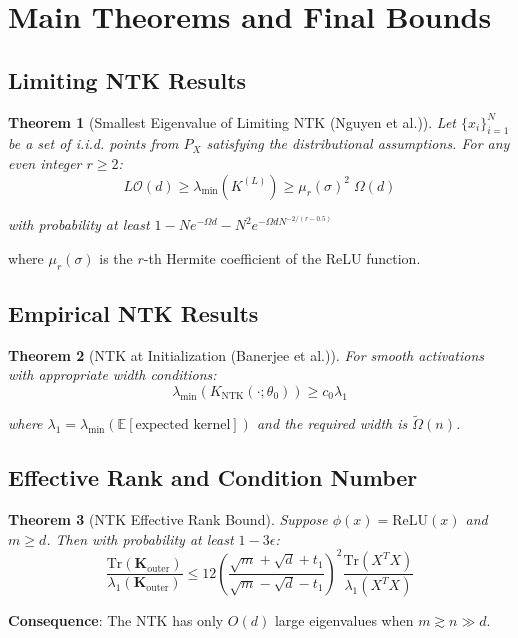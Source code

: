 \documentclass{article}
\newtheorem{theorem}{Theorem}[section]
\newcommand{\E}{\mathbb{E}}
\newcommand{\evmin}[1]{\lambda_{\min}\left(#1\right)}
\newcommand{\bigOmg}{\Omega}
\newcommand{\KNTK}{K_{\text{NTK}}}
\newcommand{\lambdaMin}{\lambda_{\min}}
\newcommand{\Order}{\mathcal{O}}
\newcommand{\TildeOmega}{\tilde{\Omega}}
\begin{document}
\section{Main Theorems and Final Bounds}

\subsection{Limiting NTK Results}

\begin{theorem}[Smallest Eigenvalue of Limiting NTK (Nguyen et al.)]
Let $\{x_i\}_{i=1}^{N}$ be a set of i.i.d. points from $P_X$ satisfying the distributional assumptions. For any even integer $r\ge 2$:
$$L\Order(d) \geq \evmin{K^{(L)}} \geq \mu_r(\sigma)^2\; \bigOmg(d)$$

with probability at least $1 - Ne^{-\bigOmg{d}} - N^2e^{-\bigOmg{dN^{-2/(r-0.5)}}}$
\end{theorem}

where $\mu_r(\sigma)$ is the $r$-th Hermite coefficient of the ReLU function.

\subsection{Empirical NTK Results}

\begin{theorem}[NTK at Initialization (Banerjee et al.)]
For smooth activations with appropriate width conditions:
$$\lambdaMin(\KNTK(\cdot;\theta_0)) \geq c_0 \lambda_1$$

where $\lambda_1 = \lambdaMin(\E[\text{expected kernel}])$ and the required width is $\TildeOmega(n)$.
\end{theorem}

\subsection{Effective Rank and Condition Number}

\begin{theorem}[NTK Effective Rank Bound]
Suppose $\phi(x) = \text{ReLU}(x)$ and $m \geq d$. Then with probability at least $1 - 3\epsilon$:
$$\frac{\text{Tr}(\mathbf{K}_{\text{outer}})}{\lambda_1(\mathbf{K}_{\text{outer}})} \leq 12 \left(\frac{\sqrt{m} + \sqrt{d} + t_1}{\sqrt{m} - \sqrt{d} - t_1}\right)^2 \frac{\text{Tr}(X^T X)}{\lambda_1(X^T X)}$$
\end{theorem}

\textbf{Consequence}: The NTK has only $O(d)$ large eigenvalues when $m \gtrsim n \gg d$.
\end{document}
